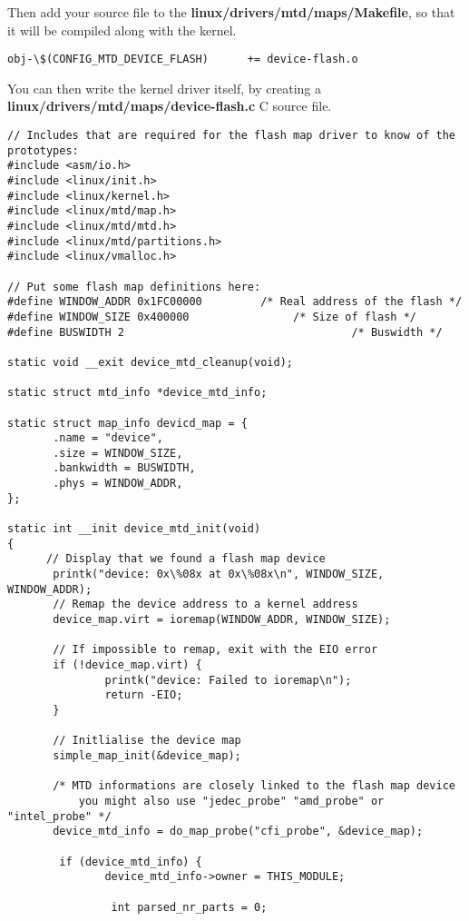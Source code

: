 Then add your source file to the \textbf{linux/drivers/mtd/maps/Makefile}, so 
that it will be compiled along with the kernel.

\begin{verbatim}
obj-\$(CONFIG_MTD_DEVICE_FLASH)      += device-flash.o
\end{verbatim}

You can then write the kernel driver itself, by creating a 
\textbf{linux/drivers/mtd/maps/device-flash.c} C source file.

\begin{verbatim}
// Includes that are required for the flash map driver to know of the prototypes:
#include <asm/io.h>
#include <linux/init.h>
#include <linux/kernel.h>
#include <linux/mtd/map.h>
#include <linux/mtd/mtd.h>
#include <linux/mtd/partitions.h>
#include <linux/vmalloc.h>

// Put some flash map definitions here:
#define WINDOW_ADDR 0x1FC00000         /* Real address of the flash */
#define WINDOW_SIZE 0x400000                /* Size of flash */
#define BUSWIDTH 2                                   /* Buswidth */

static void __exit device_mtd_cleanup(void);

static struct mtd_info *device_mtd_info;

static struct map_info devicd_map = {
       .name = "device",
       .size = WINDOW_SIZE,
       .bankwidth = BUSWIDTH,
       .phys = WINDOW_ADDR,
};

static int __init device_mtd_init(void)
{
	  // Display that we found a flash map device 
       printk("device: 0x\%08x at 0x\%08x\n", WINDOW_SIZE, WINDOW_ADDR);
	   // Remap the device address to a kernel address
       device_map.virt = ioremap(WINDOW_ADDR, WINDOW_SIZE);

       // If impossible to remap, exit with the EIO error
       if (!device_map.virt) {
               printk("device: Failed to ioremap\n");
               return -EIO;
       }

	   // Initlialise the device map
       simple_map_init(&device_map);

	   /* MTD informations are closely linked to the flash map device
	       you might also use "jedec_probe" "amd_probe" or "intel_probe" */
       device_mtd_info = do_map_probe("cfi_probe", &device_map);

 		if (device_mtd_info) {
               device_mtd_info->owner = THIS_MODULE;

				int parsed_nr_parts = 0;


\end{verbatim}

